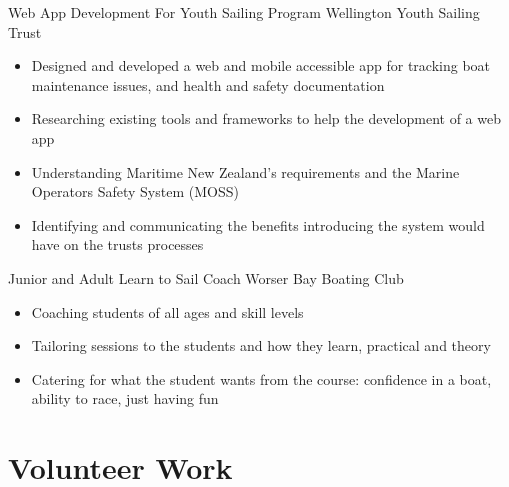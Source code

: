 \documentclass[a4paper]{twentysecondcv} %
\begin{document}
\begin{workexperience}
    {Web App Development For Youth Sailing Program}
    {Wellington Youth Sailing Trust}
    {
        \begin{itemize}
            \item Designed and developed a web and mobile accessible app for tracking boat maintenance issues, and health and safety documentation
            \item Researching existing tools and frameworks to help the development of a web app
            \item Understanding Maritime New Zealand's requirements and the Marine Operators Safety System (MOSS)
            \item Identifying and communicating the benefits introducing the system would have on the trusts processes
        \end{itemize}
    }

    {Junior and Adult Learn to Sail Coach}
    {Worser Bay Boating Club}
    {
        \begin{itemize}
            \item Coaching students of all ages and skill levels
            \item Tailoring sessions to the students and how they learn, practical and theory
            \item Catering for what the student wants from the course: confidence in a boat, ability to race, just having fun
        \end{itemize}
    }

\end{workexperience}



\newpage %

\makeprofilesecondary %



\section{Volunteer Work}
\end{document}
